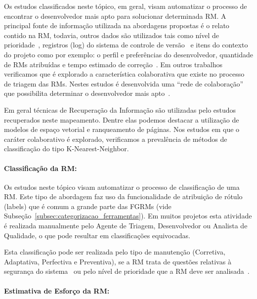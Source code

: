 Os estudos classificados neste tópico, em geral, visam automatizar o processo de
encontrar o desenvolvedor mais apto para solucionar determinada RM\@. A
principal fonte de informação utilizada na abordagens propostas é o relato
contido na RM, todavia, outros dados são utilizados tais como nível de
prioridade~\cite{tian2015automated}, registros (log) do sistema de controle de
versão~\cite{shokripour2012automatic, Hu:2014:EBT:2707683.2708297} e itens do
contexto do projeto como por exemplo: o perfil e preferências do desenvolvedor,
quantidade de RMs atribuídas e tempo estimado de
correção~\cite{hosseini2012market}. Em outros trabalhos verificamos que é
explorado a característica colaborativa que existe no processo de triagem das
RMs. Nestes estudos é desenvolvida uma ``rede de colaboração'' que possibilita
determinar o desenvolvedor mais apto~\cite{Zhang2014,Zanetti2013, Wu2011}.

Em geral técnicas de Recuperação da Informação são utilizadas pelo estudos
recuperados neste mapeamento. Dentre elas podemos destacar a utilização de
modelos de espaço vetorial e ranqueamento de páginas. Nos estudos em que o
caráter colaborativo é explorado, verificamos a prevalência de métodos de
classificação do tipo K-Nearest-Neighbor.

\paragraph{Classificação da RM:}

Os estudos neste tópico visam automatizar o processo de clas\-si\-fi\-ca\-ção de
uma RM\@.  Este tipo de abordagem faz uso da funcionalidade de atribuição de
rótulo (labels) que é comum  a grande parte das FGRMs (vide
Subseção~\ref{subsec:categorizacao_ferramentas}).  Em muitos projetos esta
atividade é realizada manualmente pelo Agente de Triagem, Desenvolvedor ou
Analista de Qualidade, o que pode resultar em classificações equivocadas.

Esta classificação pode ser realizada pelo tipo de manutenção (Corretiva,
Adaptativa, Perfectiva e Preventiva), se a RM trata de questões relativas à
segurança do sistema~\cite{gegick2010identifying, behl2014bug} ou pelo nível de
prioridade que a RM deve ser analisada~\cite{behl2014bug}.

\paragraph{Estimativa de Esforço da RM:}

